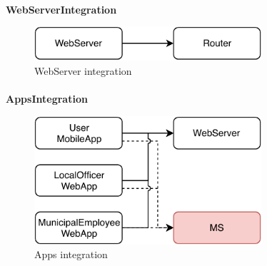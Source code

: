 			\paragraph{}
				\textbf{WebServerIntegration}
					\begin{figure}[!h]
						\centering
						\includegraphics[width=0.75\textwidth]{images/Integration/WebServerIntegration.pdf}
						\caption{WebServer integration}
					\end{figure}
			\paragraph{}
				\textbf{AppsIntegration}
					\begin{figure}[!h]
						\centering
						\includegraphics[width=0.75\textwidth]{images/Integration/AppsIntegration.pdf}
						\caption{Apps integration}
					\end{figure}